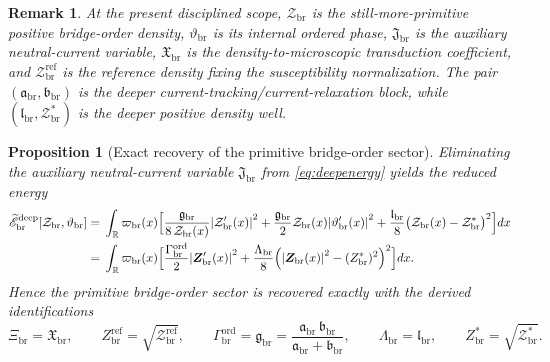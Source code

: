 \documentclass[11pt]{article}
\newcommand{\ProfWeight}{\varpi_{\mathrm{br}}}
\newcommand{\RespOrderField}{\bm Z_{\mathrm{br}}}
\newcommand{\RespOrderRef}{Z_{\mathrm{br}}^{\mathrm{ref}}}
\newcommand{\RespOrderEq}{Z_{\mathrm{br}}^{\ast}}
\newcommand{\RespOrderReadout}{\Xi_{\mathrm{br}}}
\newcommand{\RespOrderStiff}{\Gamma_{\mathrm{br}}^{\mathrm{ord}}}
\newcommand{\RespOrderQuartic}{\Lambda_{\mathrm{br}}}
\newcommand{\RespOrderPhase}{\vartheta_{\mathrm{br}}}
\newcommand{\RespDeepDensity}{\mathcal Z_{\mathrm{br}}}
\newcommand{\RespDeepDensityRef}{\mathcal Z_{\mathrm{br}}^{\mathrm{ref}}}
\newcommand{\RespDeepDensityEq}{\mathcal Z_{\mathrm{br}}^{\ast}}
\newcommand{\RespDeepReadout}{\mathfrak X_{\mathrm{br}}}
\newcommand{\RespDeepTrack}{\mathfrak a_{\mathrm{br}}}
\newcommand{\RespDeepRelax}{\mathfrak b_{\mathrm{br}}}
\newcommand{\RespDeepStiff}{\mathfrak g_{\mathrm{br}}}
\newcommand{\RespDeepWell}{\mathfrak l_{\mathrm{br}}}
\newcommand{\RespDeepAux}{\mathfrak J_{\mathrm{br}}}
\newcommand{\RespDeepReducedEnergy}{\widetilde{\mathscr E}_{\mathrm{br}}^{\mathrm{deep}}}
\newtheorem{proposition}{Proposition}
\newtheorem{remark}{Remark}
\begin{document}
\begin{remark}
At the present disciplined scope, \(\RespDeepDensity\) is the still-more-primitive positive bridge-order density, \(\RespOrderPhase\) is its internal ordered phase, \(\RespDeepAux\) is the auxiliary neutral-current variable, \(\RespDeepReadout\) is the density-to-microscopic transduction coefficient, and \(\RespDeepDensityRef\) is the reference density fixing the susceptibility normalization. The pair \((\RespDeepTrack,\RespDeepRelax)\) is the deeper current-tracking/current-relaxation block, while \((\RespDeepWell,\RespDeepDensityEq)\) is the deeper positive density well.
\end{remark}

\begin{proposition}[Exact recovery of the primitive bridge-order sector]
\label{prop:orderrecovery}
Eliminating the auxiliary neutral-current variable \(\RespDeepAux\) from \eqref{eq:deepenergy} yields the reduced energy
\begin{align}
\RespDeepReducedEnergy[\RespDeepDensity,\RespOrderPhase]
=\;&
\int_{\mathbb R}\ProfWeight(x)\Bigl[
\frac{\RespDeepStiff}{8\,\RespDeepDensity(x)}\abs{\RespDeepDensity'(x)}^2
+
\frac{\RespDeepStiff}{2}\RespDeepDensity(x)\abs{\RespOrderPhase'(x)}^2
+
\frac{\RespDeepWell}{8}\bigl(\RespDeepDensity(x)-\RespDeepDensityEq\bigr)^2
\Bigr]dx
\nonumber\\
=\;&
\int_{\mathbb R}\ProfWeight(x)\Bigl[
\frac{\RespOrderStiff}{2}\abs{\RespOrderField'(x)}^2
+
\frac{\RespOrderQuartic}{8}\Bigl(\abs{\RespOrderField(x)}^2-(\RespOrderEq)^2\Bigr)^2
\Bigr]dx.
\label{eq:deepreduced}
\end{align}
Hence the primitive bridge-order sector is recovered exactly with the derived identifications
\begin{equation}
\RespOrderReadout=\RespDeepReadout,
\qquad
\RespOrderRef=\sqrt{\RespDeepDensityRef},
\qquad
\RespOrderStiff=\RespDeepStiff=\frac{\RespDeepTrack\,\RespDeepRelax}{\RespDeepTrack+\RespDeepRelax},
\qquad
\RespOrderQuartic=\RespDeepWell,
\qquad
\RespOrderEq=\sqrt{\RespDeepDensityEq}.
\label{eq:orderfromdeep}
\end{equation}
\end{proposition}
\end{document}
